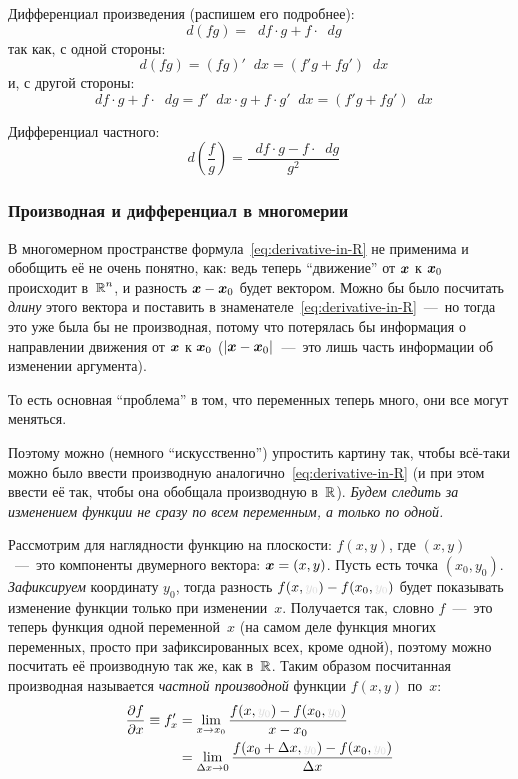 \documentclass[a4paper,12pt]{article}
\newcommand{\diff}{\mathop{}\!d}
\begin{document}
  Дифференциал произведения (распишем его подробнее):
  \[
    \diff (fg) = \diff f \cdot g + f \cdot \diff g
  \]
  так как, с одной стороны:
  \[
    \diff (fg) = (fg)' \diff x = (f'g + fg') \diff x
  \]
  и, с другой стороны:
  \[
    \diff f \cdot g + f \cdot \diff g = f' \diff x \cdot g + f \cdot g' \diff x
      = (f' g + fg') \diff x
  \]

  Дифференциал частного:
  \[
    \diff \left(\frac{f}{g}\right) = \frac{\diff f \cdot g - f \cdot \diff g}{g^2}
  \]


  \subsubsection{Производная и дифференциал в многомерии}  %

  В многомерном пространстве формула~\eqref{eq:derivative-in-R} не применима и обобщить её не очень понятно, как: ведь теперь ``движение'' от $\boldsymbol x$ к $\boldsymbol x_0$ происходит в~$\operatorname{\mathbb R}^n$, и разность $\bds x \hm- \bds x_0$ будет вектором.
  Можно бы было посчитать \emph{длину} этого вектора и поставить в знаменателе~\eqref{eq:derivative-in-R}~---~но тогда это уже была бы не производная, потому что потерялась бы информация о направлении движения от $\boldsymbol x$ к $\boldsymbol x_0$ ($|\bds x \hm- \bds x_0|$~---~это лишь часть информации об изменении аргумента).

  То есть основная ``проблема'' в том, что переменных теперь много, они все могут меняться.

  Поэтому можно (немного ``искусственно'') упростить картину так, чтобы всё-таки можно было ввести производную аналогично~\eqref{eq:derivative-in-R} (и при этом ввести её так, чтобы она обобщала производную в~$\operatorname{\mathbb R}$).
  \emph{Будем следить за изменением функции не сразу по всем переменным, а только по одной.}

  Рассмотрим для наглядности функцию на плоскости: $f(x, y)$, где $(x, y)$~---~это компоненты двумерного вектора: $\bds x \hm= (x, y)$.
  Пусть есть точка $(x_0, y_0)$.
  \emph{Зафиксируем} координату $y_0$, тогда разность $f(x, \textcolor{grey}{y_0}) \hm- f(x_0, \textcolor{grey}{y_0})$ будет показывать изменение функции только при изменении~$x$.
  Получается так, словно $f$~---~это теперь функция одной переменной~$x$ (на самом деле функция многих переменных, просто при зафиксированных всех, кроме одной), поэтому можно посчитать её производную так же, как в~$\operatorname{\mathbb R}$.
  Таким образом посчитанная производная называется \emph{частной производной} функции $f(x, y)$ по~$x$:
  \begin{equation*}
  \begin{split}
    \frac{\partial f}{\partial x} \equiv f'_x
      &= \lim_{x \to x_0} \frac{f(x, \textcolor{grey}{y_0}) - f(x_0, \textcolor{grey}{y_0})}{x - x_0}\\
      &= \lim_{\Delta x \to 0} \frac{f(x_0 + \Delta x, \textcolor{grey}{y_0}) - f(x_0, \textcolor{grey}{y_0})}{\Delta x}
  \end{split}
  \end{equation*}
\end{document}
